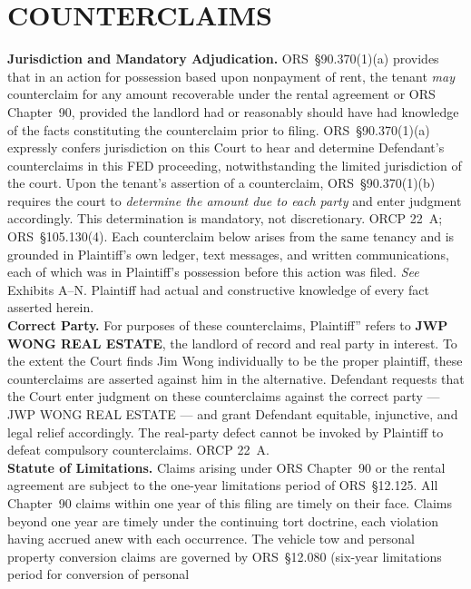 \documentclass[10pt,letterpaper,oneside]{extarticle}
\begin{document}
\section{\textbf{COUNTERCLAIMS}}
\indent \textbf{Jurisdiction and Mandatory Adjudication.}
ORS~\S90.370(1)(a) provides that in an action for
possession based upon nonpayment of rent, the tenant
\textit{may} counterclaim for any amount recoverable under
the rental agreement or ORS Chapter~90, provided the
landlord had or reasonably should have had knowledge of the
facts constituting the counterclaim prior to filing.
ORS~\S90.370(1)(a) expressly confers jurisdiction on this
Court to hear and determine Defendant's counterclaims in
this FED proceeding, notwithstanding the limited
jurisdiction of the court. Upon the tenant's assertion of
a counterclaim, ORS~\S90.370(1)(b) requires the court to
\textit{determine the amount due to each party} and enter
judgment accordingly. This determination is mandatory, not
discretionary. ORCP 22~A; ORS~\S105.130(4). Each
counterclaim below arises from the same tenancy and is
grounded in Plaintiff's own ledger, text messages, and
written communications, each of which was in Plaintiff's
possession before this action was filed.
\textit{See} Exhibits A--N. Plaintiff had actual and
constructive knowledge of every fact asserted herein.\\
\indent \textbf{Correct Party.} For purposes of these
counterclaims, Plaintiff'' refers to \textbf{JWP WONG
	REAL ESTATE}, the landlord of record and real party in
interest. To the extent the Court finds Jim Wong
individually to be the proper plaintiff, these
counterclaims are asserted against him in the alternative.
Defendant requests that the Court enter judgment on these
counterclaims against the correct party --- JWP WONG REAL
ESTATE --- and grant Defendant equitable, injunctive, and
legal relief accordingly. The real-party defect cannot be
invoked by Plaintiff to defeat compulsory counterclaims.
ORCP 22~A.\\
\indent \textbf{Statute of Limitations.} Claims arising
under ORS Chapter~90 or the rental agreement are subject
to the one-year limitations period of ORS~\S12.125. All
Chapter~90 claims within one year of this filing are timely
on their face. Claims beyond one year are timely under the
continuing tort doctrine, each violation having accrued
anew with each occurrence. The vehicle tow and personal
property conversion claims are governed by ORS~\S12.080
(six-year limitations period for conversion of personal
\end{document}

